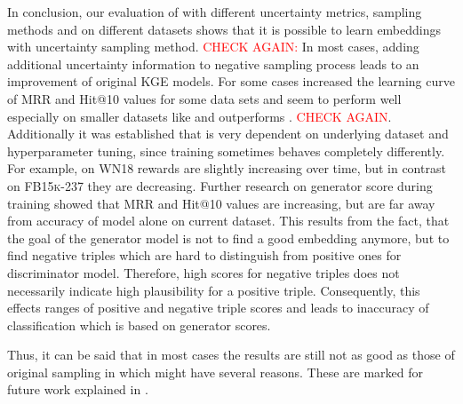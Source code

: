 In conclusion, our evaluation of \ucgan with different uncertainty metrics, sampling methods and on different datasets shows that it is possible to learn embeddings with uncertainty sampling method.
\textcolor{red}{CHECK AGAIN:} In most cases, adding additional uncertainty information to negative sampling process leads to an improvement of original \ac{KGE} models.
For some cases \ucgan increased the learning curve of MRR and Hit@10 values for some data sets and seem to perform well especially on smaller datasets like \umls and outperforms \kbgan. \textcolor{red}{CHECK AGAIN}.
Additionally it was established that \ucgan is very dependent on underlying dataset and hyperparameter tuning, since training sometimes behaves completely differently.
For example, on \textsc{WN18} rewards are slightly increasing over time, but in contrast on \textsc{FB15k-237} they are decreasing.
Further research on generator score during training showed that MRR and Hit@10 values are increasing, but are far away from accuracy of model alone on current dataset.
This results from the fact, that the goal of the generator model is not to find a good embedding anymore, but to find negative triples which are hard to distinguish from positive ones for discriminator model.
Therefore, high scores for negative triples does not necessarily indicate high plausibility for a positive triple.
Consequently, this effects ranges of positive and negative triple scores and leads to inaccuracy of classification which is based on generator scores.

Thus, it can be said that in most cases the results are still not as good as those of original sampling in \kbgan which might have several reasons.
These are marked for future work explained in .





